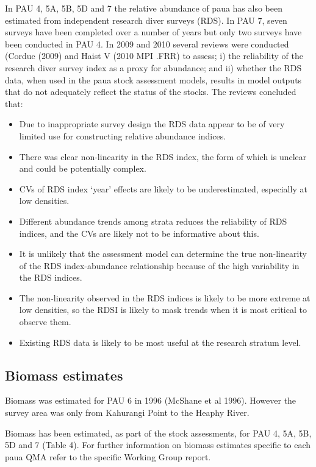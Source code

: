 \documentclass{mpi-plenary}
\providecommand{\tightlist}{%
  \setlength{\itemsep}{0pt}\setlength{\parskip}{0pt}}
\theoremstyle{definition}
\theoremstyle{definition}
\theoremstyle{definition}
\theoremstyle{remark}
\begin{document}
In PAU 4, 5A, 5B, 5D and 7 the relative abundance of paua has also been
estimated from independent research diver surveys (RDS). In PAU 7, seven
surveys have been completed over a number of years but only two surveys
have been conducted in PAU 4. In 2009 and 2010 several reviews were
conducted (Cordue (2009) and Haist V (2010 MPI .FRR) to assess; i) the
reliability of the research diver survey index as a proxy for abundance;
and ii) whether the RDS data, when used in the paua stock assessment
models, results in model outputs that do not adequately reflect the
status of the stocks. The reviews concluded that:

\begin{itemize}
\tightlist
\item
  Due to inappropriate survey design the RDS data appear to be of very
  limited use for constructing relative abundance indices.
\item
  There was clear non-linearity in the RDS index, the form of which is
  unclear and could be potentially complex.\\
\item
  CVs of RDS index `year' effects are likely to be underestimated,
  especially at low densities.
\item
  Different abundance trends among strata reduces the reliability of RDS
  indices, and the CVs are likely not to be informative about this.
\item
  It is unlikely that the assessment model can determine the true
  non-linearity of the RDS index-abundance relationship because of the
  high variability in the RDS indices.
\item
  The non-linearity observed in the RDS indices is likely to be more
  extreme at low densities, so the RDSI is likely to mask trends when it
  is most critical to observe them.
\item
  Existing RDS data is likely to be most useful at the research stratum
  level.
\end{itemize}

\subsection{Biomass estimates}\label{biomass-estimates}

Biomass was estimated for PAU 6 in 1996 (McShane et al 1996). However
the survey area was only from Kahurangi Point to the Heaphy River.

Biomass has been estimated, as part of the stock assessments, for PAU 4,
5A, 5B, 5D and 7 (Table 4). For further information on biomass estimates
specific to each paua QMA refer to the specific Working Group report.
\end{document}
